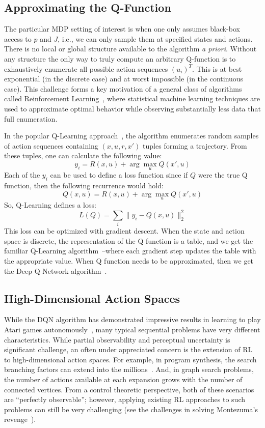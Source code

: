 \subsection*{Approximating the Q-Function}
The particular MDP setting of interest is when one only assumes black-box access to $p$ and $J$, i.e., we can only sample them at specified states and actions. There is no local or global structure available to the algorithm \emph{a priori}. Without any structure the only way to truly compute an arbitrary Q-function is to exhaustively enumerate all possible action sequences $(u_i)^T$. This is at best exponential (in the discrete case) and at worst impossible (in the continuous case). This challenge forms a key motivation of a general class of algorithms called Reinforcement Learning~\cite{sutton1998reinforcement}, where statistical machine learning techniques are used to approximate optimal behavior while observing substantially less data that full enumeration. 

In the popular Q-Learning approach~\cite{sutton1998reinforcement}, the algorithm enumerates random samples of action sequences containing $(x,u,r, x')$ tuples forming a trajectory. From these tuples, one can calculate the following value:
\[
y_i = R(x,u) + \arg \max_{u} Q(x',u)
\]
Each of the $y_i$ can be used to define a loss function since if $Q$ were the true Q function, then the following recurrence would hold:
\[
Q(x,u) = R(x,u) + \arg \max_{u} Q(x',u)
\]
So, Q-Learning defines a loss:
\[
L(Q) = \sum_{i} \|y_i - Q(x,u)\|_2^2
\]
This loss can be optimized with gradient descent. When the state and action space is discrete, the representation of the Q function is a table, and we get the familiar Q-Learning algorithm~\cite{sutton1998reinforcement}--where each gradient step updates the table with the appropriate value. When Q function needs to be approximated, then we get the Deep Q Network algorithm~\cite{mnih2015human}.

\subsection*{High-Dimensional Action Spaces}
While the DQN algorithm has demonstrated impressive results in learning to play Atari games autonomously~\cite{mnih2015human}, many typical sequential problems have very different characteristics. While partial observability and perceptual uncertainty is significant challenge, an often under appreciated concern is the extension of RL to high-dimensional action spaces. For example, in program synthesis, the search branching factors can extend into the millions~\cite{menon2013machine}. And, in graph search problems, the number of actions available at each expansion grows with the number of connected vertices. From a control theoretic perspective, both of these scenarios are ``perfectly observable''; however, applying existing RL approaches to such problems can still be very challenging (see the challenges in solving Montezuma's revenge~\cite{bellemare2016unifying}).

